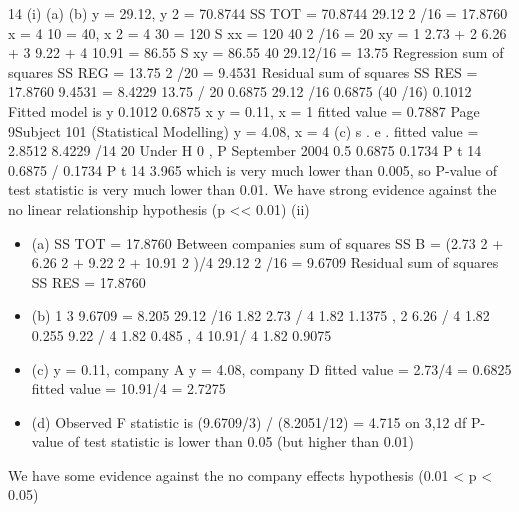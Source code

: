 \documentclass[a4paper,12pt]{article}
\begin{document}

14
(i)
(a)
(b)
y = 29.12, y 2 = 70.8744
SS TOT = 70.8744 29.12 2 /16 = 17.8760
x = 4 10 = 40, x 2 = 4 30 = 120
S xx = 120 40 2 /16 = 20
xy = 1 2.73 + 2 6.26 + 3 9.22 + 4 10.91 = 86.55
S xy = 86.55 40 29.12/16 = 13.75
Regression sum of squares SS REG = 13.75 2 /20 = 9.4531
Residual sum of squares SS RES = 17.8760 9.4531 = 8.4229
13.75 / 20 0.6875
29.12 /16 0.6875 (40 /16) 0.1012
Fitted model is y 0.1012 0.6875 x
y = 0.11, x = 1 fitted value = 0.7887
Page 9Subject 101 (Statistical Modelling)
y = 4.08, x = 4
(c)
s . e .
fitted value = 2.8512
8.4229 /14
20
Under H 0 , P
September 2004
0.5
0.6875
0.1734
P t 14
0.6875 / 0.1734
P t 14
3.965
which is very much lower than 0.005, so P-value of test statistic is very
much lower than 0.01.
We have strong evidence against the no linear relationship
hypothesis (p << 0.01)
(ii)
\begin{itemize}
    \item (a)
SS TOT = 17.8760
Between companies sum of squares
SS B = (2.73 2 + 6.26 2 + 9.22 2 + 10.91 2 )/4
29.12 2 /16 = 9.6709
Residual sum of squares SS RES = 17.8760
    \item (b)
1
3
9.6709 = 8.205
29.12 /16 1.82
2.73 / 4 1.82
1.1375 , 2 6.26 / 4 1.82
0.255
9.22 / 4 1.82 0.485 , 4 10.91/ 4 1.82 0.9075
    \item (c) y = 0.11, company A
y = 4.08, company D
fitted value = 2.73/4 = 0.6825
fitted value = 10.91/4 = 2.7275
    \item (d) Observed F statistic is (9.6709/3) / (8.2051/12) = 4.715 on 3,12 df
P-value of test statistic is lower than 0.05 (but higher than 0.01)
\end{itemize}

We have some evidence against the no company effects hypothesis
(0.01 < p < 0.05)
\end{document}
